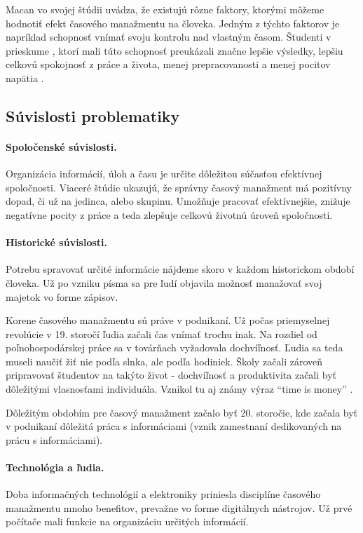 \documentclass[10pt,slovak,a4paper]{article}
\begin{document}
		Macan \cite{Macan} vo svojej štúdii uvádza, že existujú rôzne faktory, ktorými môžeme hodnotiť efekt časového manažmentu na človeka. Jedným  z týchto faktorov je napríklad schopnosť vnímať svoju kontrolu nad vlastným časom. Študenti v prieskume \cite{Macan}, ktorí mali túto schopnosť preukázali značne lepšie výsledky, lepšiu celkovú spokojnosť z práce a života, menej prepracovanosti a menej pocitov napätia \cite{Macan}.
		
	\subsection{Súvislosti problematiky} \label{spojitost}
		
		\paragraph{Spoločenské súvislosti.\\}
		Organizácia informácií, úloh a času je určite dôležitou súčasťou efektívnej spoločnosti. Viaceré štúdie \cite{Macan} ukazujú, že správny časový manažment má pozitívny dopad, či už na jedinca, alebo skupinu. Umožňuje pracovať efektívnejšie, znižuje negatívne pocity z práce a teda zlepšuje celkovú životnú úroveň spoločnosti.
		
		\paragraph{Historické súvislosti.\\}
		Potrebu spravovať určité informácie nájdeme skoro v každom historickom období človeka. Už po vzniku písma sa pre ľudí objavila možnosť manažovať svoj majetok vo forme zápisov.
		
		Korene časového manažmentu sú práve v podnikaní. Už počas priemyselnej revolúcie v 19. storočí ľudia začali čas vnímať trochu inak. Na rozdiel od poľnohospodárskej práce sa v továrňach vyžadovala dochvíľnosť. Ľudia sa teda museli naučiť žiť nie podľa slnka, ale podľa hodiniek. Školy začali zároveň pripravovať študentov na takýto život - dochvíľnosť a produktivita začali byť dôležitými vlasnosťami individuála. Vznikol tu aj známy výraz \enquote{time is money} \cite{TimeMagHisto}.
		
		Dôležitým obdobím pre časový manažment začalo byť 20. storočie, kde začala byť v podnikaní dôležitá práca s informáciami (vznik zamestnaní dedikovaných na prácu s informáciami).
		
		\paragraph{Technológia a ľudia.\\}
		Doba informačných technológií a elektroniky priniesla disciplíne časového manažmentu mnoho benefitov, prevažne vo forme digitálnych nástrojov. Už prvé počítače mali funkcie na organizáciu určitých informácií. 
		
\end{document}
